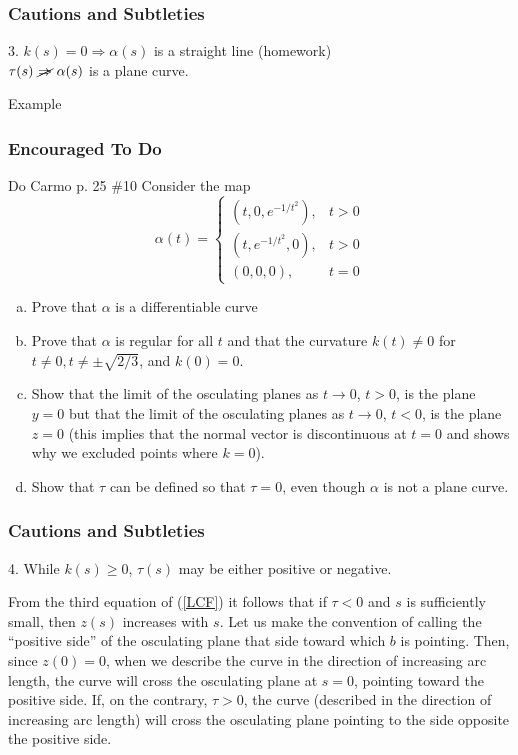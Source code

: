 \documentclass[handout]{beamer}
\theoremstyle{definition}
\theoremstyle{remark}
\renewcommand{\=}{&=&}
\newcommand{\<}{\langle}
\renewcommand{\>}{\rangle}
\begin{document}
\begin{frame}[t]
\frametitle{Cautions and Subtleties}
\begin{center}
3. $k(s) = 0 \Rightarrow \alpha(s)$ is a straight line (homework)\\
$\tau(s) \  \cancel{\Rightarrow} \  \alpha(s)$ is a plane curve.
\end{center}
\begin{block}{Example} \end{block}
\end{frame}

\begin{frame}[t]
\frametitle{Encouraged To Do}
\begin{block}{Do Carmo p. 25 \#10}
Consider the map
\[
\alpha(t) = \begin{cases} 
(t,0,e^{-1/t^2}), & t > 0 \\
(t,e^{-1/t^2},0), & t > 0 \\
(0,0,0), & t = 0
\end{cases}
\]
\vspace{-.5cm}
\begin{enumerate}[a.]
\item Prove that $\alpha$ is a differentiable curve
\item Prove that $\alpha$ is regular for all $t$ and that the curvature $k(t) \ne 0$ for $t \ne 0, t
\ne \pm \sqrt{2/3}$, and $k(0) = 0$.
\item Show that the limit of the osculating planes as $t \to 0$, $t > 0$, is the plane $y=0$ but that
the limit of the osculating planes as $t \to 0$, $t < 0$, is the plane $z=0$ (this implies that the
normal vector is discontinuous at $t = 0$ and shows why we excluded points where $k = 0$).
\item Show that $\tau$ can be defined so that $\tau = 0$, even though $\alpha$ is not a plane
curve.
\end{enumerate}
\end{block}
\end{frame}

\begin{frame}[t]
\frametitle{Cautions and Subtleties}
\begin{center}
\large 4. While $k(s) \ge 0$, $\tau(s)$ may be either positive or negative.
\end{center}
\vspace{-.75cm}
\begin{block}{}
From the third equation of (\ref{LCF}) it follows that if $\tau < 0$ and $s$ is sufficiently small,
then $z(s)$ increases with $s$. Let us make the convention of calling the ``positive side'' of the
osculating plane that side toward which $b$ is pointing. Then, since $z(0) = 0$, when we
describe the curve in the direction of increasing arc length, the curve will cross the osculating
plane at $s = 0$, pointing toward the positive side. If, on the contrary, $\tau > 0$, the curve
(described in the direction of increasing arc length) will cross the osculating plane pointing
to the side opposite the positive side.
\end{block}
\end{frame}
\end{document}
